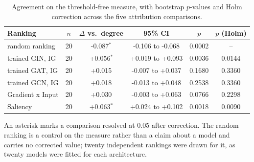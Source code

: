 \begin{table}[htbp]
\centering
\caption{Agreement on the threshold-free measure, with bootstrap $p$-values and Holm correction across the five attribution comparisons.}
\label{tab:auroc_p}
\footnotesize
\setlength{\tabcolsep}{4pt}
\begin{tabular}{lccccc}
\toprule
Ranking & $n$ & $\Delta$ vs.\ degree & 95\% CI & $p$ & $p$ (Holm) \\
\midrule
random ranking & 20 & -0.087$^{*}$ & -0.106 to -0.068 & 0.0002 & -- \\
trained GIN, IG & 20 & +0.056$^{*}$ & +0.019 to +0.093 & 0.0036 & 0.0144 \\
trained GAT, IG & 20 & +0.015 & -0.007 to +0.037 & 0.1680 & 0.3360 \\
trained GCN, IG & 20 & +0.018 & -0.013 to +0.048 & 0.2538 & 0.3360 \\
Gradient x Input & 20 & +0.030 & -0.003 to +0.063 & 0.0766 & 0.2298 \\
Saliency & 20 & +0.063$^{*}$ & +0.024 to +0.102 & 0.0018 & 0.0090 \\
\bottomrule
\end{tabular}
\begin{flushleft}\footnotesize An asterisk marks a comparison resolved at 0.05 after correction. The random ranking is a control on the measure rather than a claim about a model and carries no corrected value; twenty independent rankings were drawn for it, as twenty models were fitted for each architecture.\end{flushleft}
\end{table}
